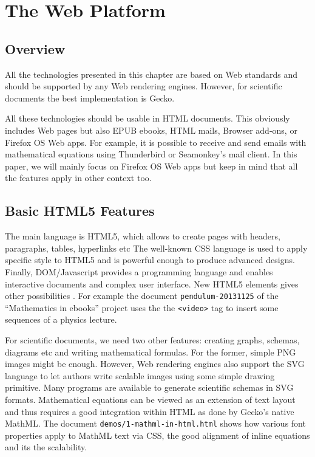 \chapter{The Web Platform}

\section{Overview}

All the technologies presented in this chapter are based on Web standards and
should be supported by any Web rendering engines. However, for scientific
documents the best implementation is Gecko.

All these technologies should be usable in HTML documents. This obviously
includes Web pages but also EPUB ebooks, HTML mails, Browser add-ons, or
Firefox OS Web apps. For example, it is possible to receive and send emails
with mathematical equations using Thunderbird or Seamonkey's mail client.
In this paper, we will mainly
focus on Firefox OS Web apps but keep in mind that all the features apply in
other context too.

\section{Basic HTML5 Features}

The main language is HTML5, which allows to create pages with headers,
paragraphs, tables, hyperlinks etc The well-known CSS language is used to
apply specific style to HTML5 and is powerful enough to produce advanced
designs. Finally, DOM/Javascript provides a programming language and enables
interactive documents and complex user interface. New HTML5 elements
gives other possibilities . For example the document
{\tt pendulum-20131125} of the ``Mathematics in ebooks'' project uses the
the {\tt <video>} tag to insert some sequences of a physics lecture.

For scientific documents, we need two other features: creating graphs, schemas,
diagrams etc and writing mathematical formulas. For the former, simple PNG
images might be enough. However, Web rendering engines also support the SVG
language to let authors write scalable images using some simple drawing
primitive. Many programs are available to generate scientific schemas in SVG
formats. Mathematical equations can be viewed as an extension of text layout
and thus requires a good integration within HTML as done by
Gecko's native MathML. The document {\tt demos/1-mathml-in-html.html} shows how
various font properties apply to MathML text via CSS, the good alignment
of inline equations and its the scalability.

